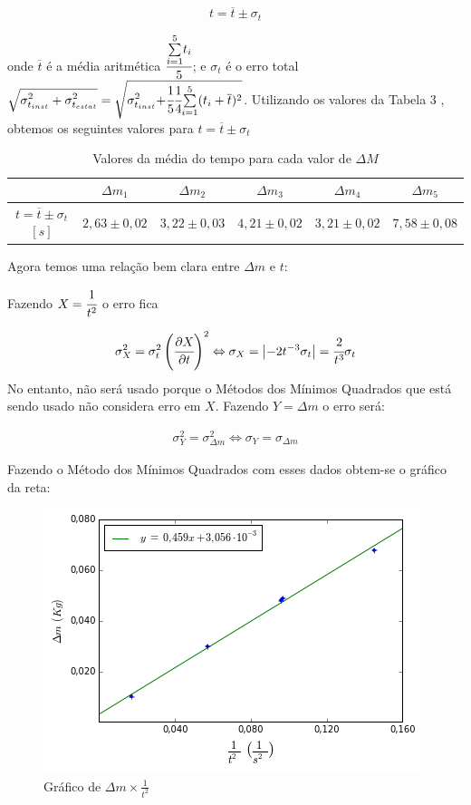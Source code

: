 \documentclass[a4paper]{article}
\providecommand{\tabularnewline}{\\} %
\begin{document}
$$t=\overline{t}\pm\sigma_{t}$$ 

onde $\overline{t}$ é a média aritmética $\cfrac[r]{\overset{{\scriptstyle 5}}{\underset{{\scriptstyle i=1}}{\sum}}t_{i}}{5}$; e $\sigma_{t}$ é o erro total $\sqrt{{\displaystyle \sigma_{t_{inst}}^{2}+\sigma_{t_{estat}}^{2}}}=\sqrt{{\displaystyle \sigma_{t_{inst}}^{2}+}\cfrac[r]{1}{5}\cfrac[l]{1}{4}\overset{{\scriptstyle 5}}{\underset{{\scriptstyle i=1}}{\sum}}(t_{i}+\overline{t})^{2}}$. Utilizando os valores da Tabela 3 , obtemos os seguintes valores para $t=\overline{t}\pm\sigma_{t}$

\begin{table}[!ht]
	\begin{centering}
	\caption{Valores da média do tempo para cada valor de $\Delta M$}
	\par\end{centering}
	\centering{}%
	\begin{tabular}{|c|c|c|c|c|c|}
	\cline{2-6} 
	\multicolumn{1}{c|}{} & $\Delta m_{1}$ & $\Delta m_{2}$ & $\Delta m_{3}$ & $\Delta m_{4}$ & $\Delta m_{5}$\tabularnewline	\hline
	$t=\overline{t}\pm\sigma_{t}$$[s]$ & $2,63\pm0,02$ & $3,22\pm0,03$ & $4,21\pm0,02$ & $3,21\pm0,02$ & $7,58\pm0,08$\tabularnewline	\hline
	\end{tabular}
\end{table}

Agora temos uma relação bem clara entre $\Delta m$ e $t$:

Fazendo $X=\cfrac{1}{t^{2}}$ o erro fica

$$\sigma_{X}^{2}=\sigma_{t}^{2}\left(\cfrac{\partial X}{\partial t}\right)^{2}\Leftrightarrow\sigma_{X}=\left|-2t^{-3}\sigma_{t}\right|=\cfrac{2}{t^{3}}\sigma_{t}$$
No entanto, não será usado porque o Métodos dos Mínimos Quadrados que está sendo usado não considera erro em $X$.
Fazendo $Y=\Delta m$ o erro será:

\begin{align}
\sigma_{Y}^{2}=\sigma_{\Delta m}^{2}\Leftrightarrow\sigma_{Y}=\sigma_{\Delta m}
\end{align}

Fazendo o Método dos Mínimos Quadrados com esses dados obtem-se o gráfico da reta:

\begin{figure}[!ht]
	\centering
		\includegraphics[scale=1]{grafico-lab04.png}
		\caption{Gráfico de $\Delta m\times\frac{1}{t^{2}}$}
\end{figure}
\end{document}
